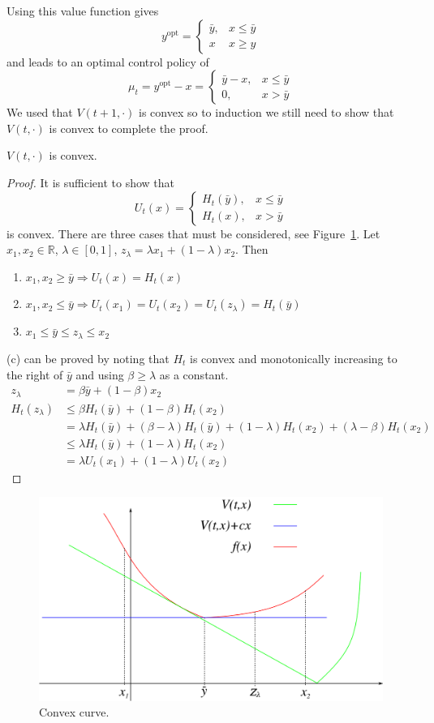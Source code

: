 Using this value function gives
$$y^{\text{opt}} = \begin{cases} \bar{y}, & x\leq\bar{y} \\ x & x\geq y \end{cases}$$
and leads to an optimal control policy of
$$\mu_t = y^{\text{opt}}-x = \begin{cases} \bar{y}-x, & x\leq\bar{y} \\ 0, & x>\bar{y} \end{cases}$$
We used that $V(t+1,\cdot)$ is convex  so to induction we still need to show that $V(t,\cdot)$ is convex to complete the proof.

\begin{theorem}
$V(t,\cdot)$ is convex.
\end{theorem}

\begin{proof}
It is sufficient to show that
$$U_t(x) = \begin{cases} H_t(\bar{y}), & x\leq\bar{y} \\ H_t(x), & x>\bar{y} \end{cases}$$
is convex.
There are three cases that must be considered, see Figure~\ref{fig:06curve}.
Let $x_1,x_2\in\mathbb{R}$, $\lambda\in[0,1]$, $z_\lambda = \lambda x_1 + (1-\lambda)x_2$.
Then
\begin{enumerate}
\item $x_1,x_2\geq\bar{y} \Rightarrow U_t(x) = H_t(x)$
\item $x_1,x_2\leq\bar{y} \Rightarrow U_t(x_1) = U_t(x_2) = U_t(z_\lambda) = H_t(\bar{y})$
\item $x_1\leq\bar{y}\leq z_\lambda\leq x_2$
\end{enumerate}
(c) can be proved by noting that $H_t$ is convex and monotonically increasing to the right of $\bar{y}$ and using $\beta\geq\lambda$ as a constant.
\begin{align*}
z_\lambda &= \beta\bar{y} + (1-\beta)x_2 \\
H_t(z_\lambda) &\leq \beta H_t(\bar{y})+(1-\beta)H_t(x_2) \\
&= \lambda H_t(\bar{y})+(\beta-\lambda)H_t(\bar{y}) + (1-\lambda)H_t(x_2) + (\lambda-\beta)H_t(x_2) \\
&\leq \lambda H_t(\bar{y}) + (1-\lambda)H_t(x_2) \\
&= \lambda U_t(x_1) + (1-\lambda)U_t(x_2)
\end{align*}
\end{proof}

\begin{figure}[ht!]
\centering
\includegraphics[width=.5\textwidth]{images/06curve}
\caption{Convex curve.}
\label{fig:06curve}
\end{figure}


